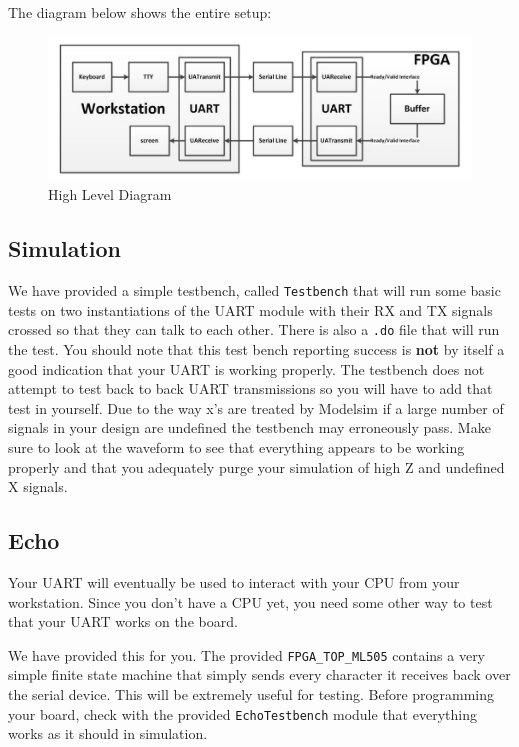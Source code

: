 \documentclass[11pt]{article}
\begin{document}
The diagram below shows the entire setup:
\begin{figure}[H]
\centering
\includegraphics[width=6in]{images/high_level_diagram.png}
\caption{High Level Diagram}
\end{figure}

\subsection{Simulation}
We have provided a simple testbench, called \verb|Testbench| that will run some basic tests on two instantiations of the UART module with their RX and TX signals crossed so that they can talk to each other. There is also a \verb|.do| file that will run the test. You should note that this test bench reporting success is \textbf{not} by itself a good indication that your UART is working properly. The testbench does not attempt to test back to back UART transmissions so you will have to add that test in yourself. Due to the way x's are treated by Modelsim if a large number of signals in your design are undefined the testbench may erroneously pass. Make sure to look at the waveform to see that everything appears to be working properly and that you adequately purge your simulation of high Z and undefined X signals.

\subsection{Echo}
Your UART will eventually be used to interact with your CPU from your workstation. Since you don't have a CPU yet, you need some other way to test that your UART works on the board.

We have provided this for you. The provided \verb|FPGA_TOP_ML505| contains a very simple finite state machine that simply sends every character it receives back over the serial device. This will be extremely useful for testing. Before programming your board, check with the provided \verb|EchoTestbench| module that everything works as it should in simulation.
\end{document}
